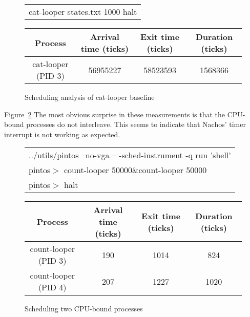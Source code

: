 \documentclass{article}
\newcommand{\command}[1]{{\sffamily#1}}
\begin{document}
\begin{landscape}
\begin{figure}
\centering

\begin{tabular}{l}
\command{cat-looper states.txt 1000}
\command{halt}
\end{tabular}

\vspace{1em}

%

\vspace{1em}

\begin{tabular}{cccc}\toprule
Process & Arrival time (ticks) & Exit time (ticks) & Duration (ticks)\\\hline
\command{cat-looper} (PID 3) & \num{56955227} & \num{58523593} & \num{1568366} \\\bottomrule
\end{tabular}
\caption{Scheduling analysis of cat-looper baseline}
\label{fig:catLooperBaseline}
\end{figure}
\end{landscape}

Figure~\ref{fig:twoCpuBound} 
The most obvious surprise in these measurements is that the CPU-bound processes do not interleave.
This seems to indicate that Nachos' timer interrupt is not working as expected.

\begin{landscape}
\begin{figure}
\centering

\begin{tabular}{l}
\command{../utils/pintos --no-vga -- -sched-instrument -q run 'shell'} \\
\command{pintos$>$ count-looper 50000\&count-looper 50000} \\
\command{pintos$>$ halt}
\end{tabular}



\vspace{1em}

\begin{tabular}{cccc}\toprule
Process & Arrival time (ticks) & Exit time (ticks) & Duration (ticks)\\\hline
\command{count-looper} (PID 3) & \num{190} & \num{1014} & \num{824} \\\bottomrule
\command{count-looper} (PID 4) & \num{207} & \num{1227} & \num{1020} \\\bottomrule
\end{tabular}
\caption{Scheduling two CPU-bound processes}
\label{fig:twoCpuBound}
\end{figure}
\end{landscape}
\end{document}
